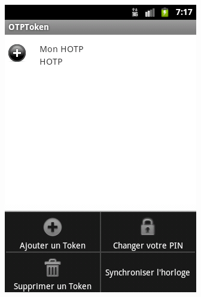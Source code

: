 \documentclass{../../../../res/univ-projet}
\begin{document}
\includegraphics[scale=0.5]{menu.png}
\end{document}
